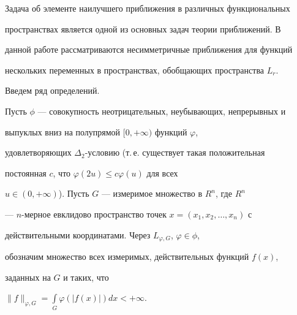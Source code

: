  


\date{} 




\pagestyle{plain} %


 




\maketitle 


\label{begin} 


 


 


 


Задача об элементе наилучшего приближения в различных функциональных 


пространствах является одной из основных задач теории приближений. В 


данной работе рассматриваются несимметричные приближения для функций 


нескольких переменных в пространствах, обобщающих пространства $L_r$. 


Введем ряд определений. 


 


Пусть $\phi$ --- совокупность неотрицательных, неубывающих, непрерывных и 


выпуклых вниз на полупрямой $[0,+\infty)$ функций $\varphi$, 


удовлетворяющих $\Delta_2$-условию (т.\,е. существует такая положительная 


постоянная $c$, что $\varphi(2u)\le c\varphi(u)$ для всех 


$u\in(0,+\infty)$). Пусть $G$ --- измеримое множество в $R^n$, где $R^n$ 


--- $n$-мерное евклидово пространство точек $x=(x_1,x_2,\dotsc,x_n)$ с 


действительными координатами. Через $L_{\varphi,G}$, $\varphi\in\phi$, 


обозначим множество всех измеримых, действительных функций $f(x)$, 


заданных на $G$ и таких, что 


$\|f\|_{\varphi,G}=\int\limits_G\varphi(|f(x)|)dx<+\infty$. 


